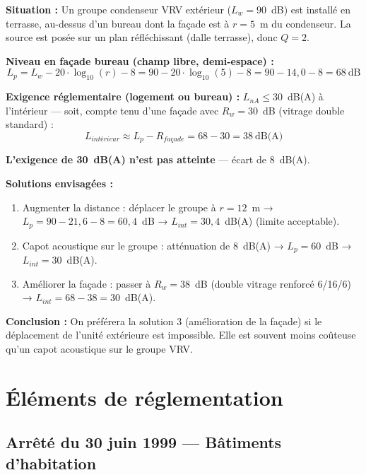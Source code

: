 \begin{exemple}[title={Dimensionnement acoustique d'une installation VRV — local technique}]
\textbf{Situation :} Un groupe condenseur VRV extérieur ($L_w = 90$~dB) est installé en terrasse, au-dessus d'un bureau dont la façade est à $r = 5$~m du condenseur. La source est posée sur un plan réfléchissant (dalle terrasse), donc $Q = 2$.

\textbf{Niveau en façade bureau (champ libre, demi-espace) :}
\[
  L_p = L_w - 20 \cdot \log_{10}(r) - 8 = 90 - 20 \cdot \log_{10}(5) - 8 = 90 - 14{,}0 - 8 = 68~\text{dB}
\]

\textbf{Exigence réglementaire (logement ou bureau) :} $L_{nA} \leq 30$~dB(A) à l'intérieur — soit, compte tenu d'une façade avec $R_w = 30$~dB (vitrage double standard) :
\[
  L_{intérieur} \approx L_p - R_{façade} = 68 - 30 = 38~\text{dB(A)}
\]

\textbf{L'exigence de 30~dB(A) n'est pas atteinte} — écart de 8~dB(A).

\textbf{Solutions envisagées :}
\begin{enumerate}
  \item Augmenter la distance : déplacer le groupe à $r = 12$~m → $L_p = 90 - 21{,}6 - 8 = 60{,}4$~dB → $L_{int} = 30{,}4$~dB(A) (limite acceptable).
  \item Capot acoustique sur le groupe : atténuation de 8~dB(A) → $L_p = 60$~dB → $L_{int} = 30$~dB(A).
  \item Améliorer la façade : passer à $R_w = 38$~dB (double vitrage renforcé 6/16/6) → $L_{int} = 68 - 38 = 30$~dB(A).
\end{enumerate}

\textbf{Conclusion :} On préférera la solution 3 (amélioration de la façade) si le déplacement de l'unité extérieure est impossible. Elle est souvent moins coûteuse qu'un capot acoustique sur le groupe VRV.
\end{exemple}

\section{Éléments de réglementation}

\subsection{Arrêté du 30 juin 1999 — Bâtiments d'habitation}

